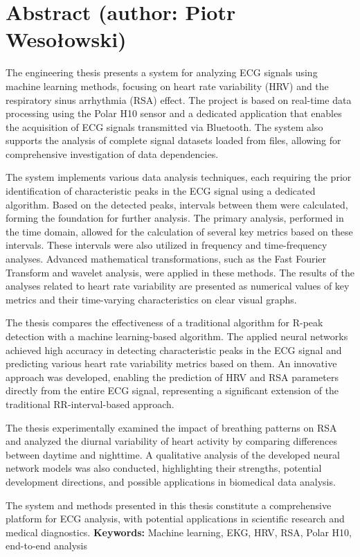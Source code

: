 \chapter*{Abstract \small{(author: Piotr Wesołowski)}}
\indent The engineering thesis presents a system for analyzing ECG signals using machine learning methods, focusing on heart rate variability (HRV) and the respiratory sinus arrhythmia (RSA) effect. The project is based on real-time data processing using the Polar H10 sensor and a dedicated application that enables the acquisition of ECG signals transmitted via Bluetooth. The system also supports the analysis of complete signal datasets loaded from files, allowing for comprehensive investigation of data dependencies.

The system implements various data analysis techniques, each requiring the prior identification of characteristic peaks in the ECG signal using a dedicated algorithm. Based on the detected peaks, intervals between them were calculated, forming the foundation for further analysis. The primary analysis, performed in the time domain, allowed for the calculation of several key metrics based on these intervals. These intervals were also utilized in frequency and time-frequency analyses. Advanced mathematical transformations, such as the Fast Fourier Transform and wavelet analysis, were applied in these methods. The results of the analyses related to heart rate variability are presented as numerical values of key metrics and their time-varying characteristics on clear visual graphs.

The thesis compares the effectiveness of a traditional algorithm for R-peak detection with a machine learning-based algorithm. The applied neural networks achieved high accuracy in detecting characteristic peaks in the ECG signal and predicting various heart rate variability metrics based on them. An innovative approach was developed, enabling the prediction of HRV and RSA parameters directly from the entire ECG signal, representing a significant extension of the traditional RR-interval-based approach.

The thesis experimentally examined the impact of breathing patterns on RSA and analyzed the diurnal variability of heart activity by comparing differences between daytime and nighttime. A qualitative analysis of the developed neural network models was also conducted, highlighting their strengths, potential development directions, and possible applications in biomedical data analysis.

The system and methods presented in this thesis constitute a comprehensive platform for ECG analysis, with potential applications in scientific research and medical diagnostics.
\vspace{0.5cm}\newline
\textbf{Keywords:} Machine learning, EKG, HRV, RSA, Polar H10, end-to-end analysis \vspace{0.5cm}